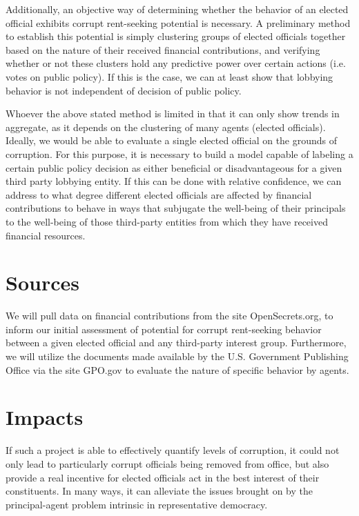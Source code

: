 \documentclass[journal]{IEEEtran}
\begin{document}
Additionally, an objective way of determining whether the behavior of an elected official exhibits corrupt rent-seeking potential is necessary. A preliminary method to establish this potential is simply clustering groups of elected officials together based on the nature of their received financial contributions, and verifying whether or not these clusters hold any predictive power over certain actions (i.e. votes on public policy). If this is the case, we can at least show that lobbying behavior is not independent of decision of public policy.

Whoever the above stated method is limited in that it can only show trends in aggregate, as it depends on the clustering of many agents (elected officials). Ideally, we would be able to evaluate a single elected official on the grounds of corruption. For this purpose, it is necessary to build a model capable of labeling a certain public policy decision as either beneficial or disadvantageous for a given third party lobbying entity. If this can be done with relative confidence, we can address to what degree different elected officials are affected by financial contributions to behave in ways that subjugate the well-being of their principals to the well-being of those third-party entities from which they have received financial resources.

\section{Sources}
We will pull data on financial contributions from the site OpenSecrets.org, to inform our initial assessment of potential for corrupt rent-seeking behavior between a given elected official and any third-party interest group. Furthermore, we will utilize the documents made available by the U.S. Government Publishing Office via the site GPO.gov to evaluate the nature of specific behavior by agents.

\section{Impacts}
If such a project is able to effectively quantify levels of corruption, it could not only lead to particularly corrupt officials being removed from office, but also provide a real incentive for elected officials act in the best interest of their constituents. In many ways, it can alleviate the issues brought on by the principal-agent problem intrinsic in representative democracy.
\end{document}
